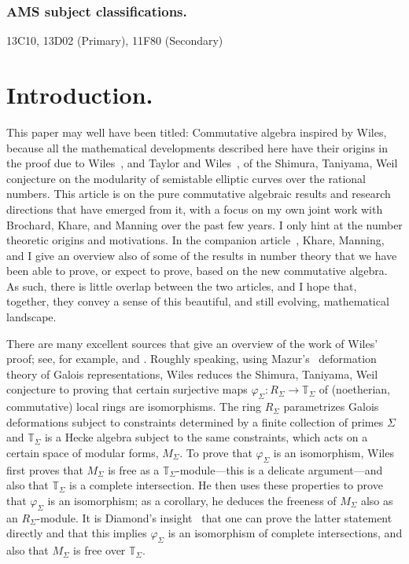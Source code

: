 \documentclass[twoside,leqno]{article}
\newcommand{\mbb}[1]{\mathbb{#1}}
\begin{document}
\subsubsection*{AMS subject classifications.} 13C10, 13D02 (Primary), 11F80 (Secondary)


\section{Introduction.}
\label{sec:intro}
This paper may well have been titled: Commutative algebra inspired by Wiles, because all the mathematical developments described here have their origins in the proof due to Wiles~\cite{Wiles:1995}, and Taylor and Wiles~\cite{Taylor/Wiles:1995}, of the Shimura, Taniyama, Weil conjecture on the modularity of semistable elliptic curves over the rational numbers. This article is on the pure commutative algebraic results and research directions that have emerged from it, with a focus on my own joint work with  Brochard, Khare, and Manning over the past few years. I only hint at the number theoretic origins and motivations. In the companion article~\cite{Iyengar/Khare/Manning:2025a}, Khare, Manning, and I give an overview also of some of the results in number theory that we have been able to prove, or expect to prove, based on the new commutative algebra. As such, there is little overlap between the two articles, and I hope that, together, they convey a sense of this beautiful, and still evolving, mathematical landscape.

There are many excellent sources that give an overview of the work of Wiles' proof; see, for example,  \cite[Chapter 1]{Cornell/Silverman/Stevens:1997} and \cite{Darmon/Diamond/Taylor:1997}. Roughly speaking, using Mazur’s~\cite{Mazur:1997} deformation theory of Galois representations, Wiles reduces the Shimura, Taniyama, Weil conjecture to proving that certain surjective maps $\varphi_\Sigma\colon R_\Sigma \to \mbb T_\Sigma$ of (noetherian, commutative) local rings are isomorphisms. The ring $R_\Sigma$ parametrizes Galois deformations subject to constraints determined by a finite collection of primes $\Sigma$ and $\mbb{T}_\Sigma$ is a Hecke algebra subject to the same constraints, which acts on a certain space of modular forms, $M_\Sigma$. To prove that $\varphi_\Sigma$ is an isomorphism, Wiles first proves that $M_\Sigma$ is free as a $\mbb{T}_\Sigma$-module---this is a delicate argument—and also that $\mbb{T}_\Sigma$ is a complete intersection. He then uses these properties to prove that $\varphi_\Sigma$ is an isomorphism; as a corollary, he deduces the freeness of $M_\Sigma$ also as an $R_\Sigma$-module. It is Diamond’s insight~\cite{Diamond:1997} that one can prove the latter statement directly and that this implies $\varphi_\Sigma$ is an isomorphism of complete intersections, and also that $M_\Sigma$ is free over $\mbb{T}_\Sigma$.
\end{document}
